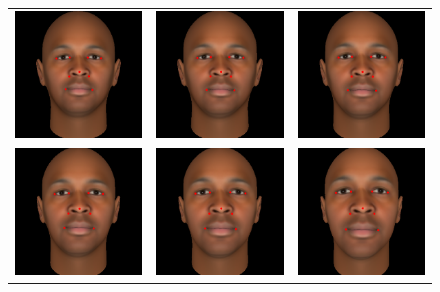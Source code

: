 \documentclass[runningheads]{llncs}
\begin{document}
\begin{figure}[ht]
\centering
\begin{tabular}{ccc}
\includegraphics[width=.25\linewidth]{resources/figures/extracted_fiducial_0006.png} &
\includegraphics[width=.25\linewidth]{resources/figures/extracted_fiducial_0008.png} &
\includegraphics[width=.25\linewidth]{resources/figures/extracted_fiducial_0001.png} \\
\includegraphics[width=.25\linewidth]{resources/figures/extracted_fiducial_0002.png} &
\includegraphics[width=.25\linewidth]{resources/figures/extracted_fiducial_0003.png} &
\includegraphics[width=.25\linewidth]{resources/figures/extracted_fiducial_0004.png} \\

\end{tabular}
\end{figure}
\end{document}
